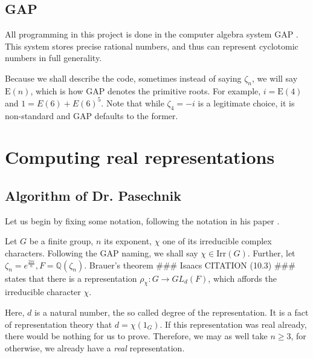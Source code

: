 \documentclass[11pt]{article}
\begin{document}
\subsection{GAP}

All programming in this project is done in the computer algebra system GAP \cite{GAP4}.
This system stores precise rational numbers, and thus can represent cyclotomic numbers in full generality.

Because we shall describe the code, sometimes instead of saying $\zeta_n$, we will say $\text{E}(n)$,
which is how GAP denotes the primitive roots. For example, $i = \text{E}(4)$ and $1 = E(6) + E(6)^5$.
Note that while $\zeta_4 = -i$ is a legitimate choice, it is non-standard and GAP defaults to the former.

\newpage

\section{Computing real representations}

\subsection{Algorithm of Dr. Pasechnik}

Let us begin by fixing some notation, following the notation in his paper \cite{Pas21}.

Let $G$ be a finite group, $n$ its exponent, $\chi$ one of its irreducible complex characters. 
Following the GAP naming, we shall say $\chi \in \text{Irr}(G)$. Further, let $\zeta_n = e^{\frac{2\pi i}{n}}, F=\mathbb{Q}(\zeta_n)$.
Brauer's theorem \#\#\# Isaacs CITATION (10.3) \#\#\# states that there is a
representation $\rho_\chi: G \rightarrow GL_d(F)$, which affords the irreducible character $\chi$.

Here, $d$ is a natural number, the so called degree of the representation.
It is a fact of representation theory that $d = \chi(1_G)$.
If this representation was real already, there would be nothing for us to prove. Therefore, we may
as well take $n \geq 3$, for otherwise, we already have a \textit{real} representation.
\end{document}
